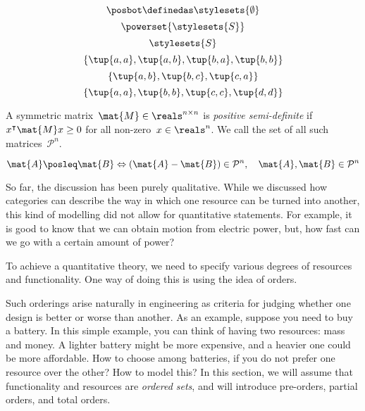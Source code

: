 {\begin{forslides}
		\begin{equation*}
			\label{eq:pow_5}
			\posbot \definedas \stylesets{\emptyset}
		\end{equation*}
		\begin{equation*}
			\label{eq:pow_6}
			\powerset{\stylesets{S}}
		\end{equation*}
		\begin{equation*}
			\label{eq:pow_7}
			\stylesets{S}
		\end{equation*}
		\begin{equation*}
			\label{eq:pre_ex1}
			\{\tup{a,a},\tup{a,b},\tup{b,a},\tup{b,b}\}
		\end{equation*}
		\begin{equation*}
			\label{eq:pre_ex2}
			\{\tup{a,b},\tup{b,c},\tup{c,a}\}
		\end{equation*}
		\begin{equation*}
			\label{eq:pre_ex3}
			\{\tup{a,a},\tup{b,b},\tup{c,c},\tup{d,d}\}
		\end{equation*}
		\begin{definition}
			\label{def:posdef}
			A symmetric matrix~$\mat{M}\in \reals^{n\times n}$ is \emph{positive semi-definite} if~$x^\intercal \mat{M}x\geq 0$ for all non-zero~$x\in \reals^n$.
			We call the set of all such matrices~$\mathcal{P}^n$.
		\end{definition}
		\begin{equation*}
			\label{eq:posdef_1}
			\mat{A}\posleq \mat{B} \Leftrightarrow (\mat{A}-\mat{B})\in \mathcal{P}^n, \quad \mat{A},\mat{B}\in \mathcal{P}^n
		\end{equation*}
	\end{forslides}
}

So far, the discussion has been purely qualitative.
While we discussed how categories can describe the way in which one resource can be turned into another, this kind of modelling did not allow for quantitative statements.
For example, it is good to know that we can obtain motion from electric power, but, how fast can we go with a certain amount of power?

To achieve a quantitative theory, we need to specify various degrees of resources and functionality.
One way of doing this is using the idea of orders.

Such orderings arise naturally in engineering as criteria for judging whether one design is better or worse than another.
As an example, suppose you need to buy a battery.
In this simple example, you can think of having two resources: mass and money.
A lighter battery might be more expensive, and a heavier one could be more affordable.
How to choose among batteries, if you do not prefer one resource over the other?
How to model this?
In this section, we will assume that functionality and resources are \emph{ordered sets}, and will introduce pre-orders, partial orders, and total orders.

